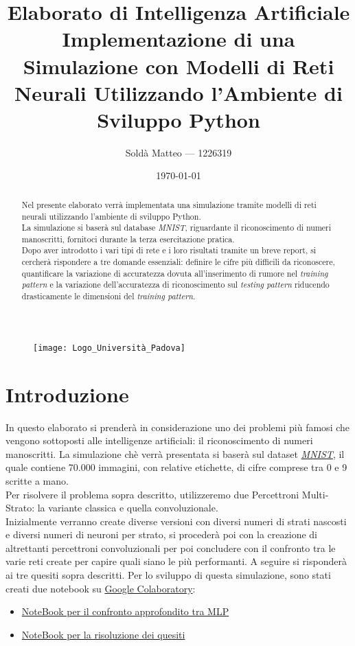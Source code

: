 \documentclass[12pt, a4paper]{article}
\title{\textbf{Elaborato di Intelligenza Artificiale} \\ Implementazione di una Simulazione con Modelli di Reti Neurali Utilizzando l'Ambiente di Sviluppo Python}
\author{Soldà Matteo --- 1226319}
\date{\today}
\begin{document}
\begin{figure}
    \centering
    \texttt{[image: Logo\_Università\_Padova]}
\end{figure}

\maketitle

\newpage
\begin{abstract}
Nel presente elaborato verrà implementata una simulazione tramite modelli di reti neurali utilizzando l'ambiente di sviluppo Python.\\
La simulazione si baserà sul database \textit{MNIST}, riguardante il riconoscimento di numeri manoscritti, fornitoci durante la terza esercitazione pratica.\\
Dopo aver introdotto i vari tipi di rete e i loro risultati tramite un breve report, si cercherà rispondere a tre domande essenziali: definire le cifre più difficili da riconoscere, quantificare la variazione di accuratezza dovuta all'inserimento di rumore nel \textit{training pattern} e la variazione dell'accuratezza di riconoscimento sul \textit{testing pattern} riducendo drasticamente le dimensioni del \textit{training pattern}.    
\end{abstract}

\newpage
\tableofcontents

\newpage
\section{Introduzione}
In questo elaborato si prenderà in considerazione uno dei problemi più famosi che vengono sottoposti alle intelligenze artificiali: il riconoscimento di numeri manoscritti.
La simulazione chè verrà presentata si baserà sul dataset \href{http://yann.lecun.com/exdb/mnist/}{\textit{MNIST}}, il quale contiene 70.000 immagini, con relative etichette, di cifre comprese tra 0 e 9 scritte a mano.\\
Per risolvere il problema sopra descritto, utilizzeremo due Percettroni Multi-Strato: la variante classica e quella convoluzionale.\\
Inizialmente verranno create diverse versioni con diversi numeri di strati nascosti e diversi numeri di neuroni per strato, si procederà poi con la creazione di altrettanti percettroni convoluzionali per poi concludere con il confronto tra le varie reti create per capire quali siano le più performanti. A seguire si risponderà ai tre quesiti sopra descritti.
Per lo sviluppo di questa simulazione, sono stati creati due notebook su \href{https://colab.research.google.com/?utm_source=scs-index}{Google Colaboratory}:
\begin{itemize}
    \item \href{https://colab.research.google.com/drive/1e4vY_9wn6-ugL5NivZc0RBluGdfWqTUM?usp=sharing}{NoteBook per il confronto approfondito tra MLP}
    \item \href{https://colab.research.google.com/drive/1v2dkWKelr-q5CTpsDUDqp55PUqiId64F?usp=sharing}{NoteBook per la risoluzione dei quesiti}
\end{itemize}
\end{document}
